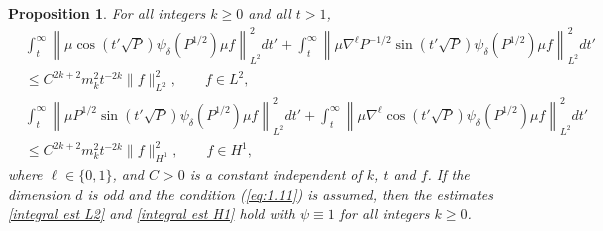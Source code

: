 \documentclass[11pt]{amsart}
\newtheorem{prop}[Theorem]{Proposition}
\numberwithin{equation}{section}
\begin{document}
\begin{prop} \label{integral estimates}
For all integers $k \ge 0$ and all $t>1$,
\begin{equation}\label{integral est L2}
\begin{split}
&\int_t^\infty \left\|\mu\cos(t'\sqrt{P})\psi_\delta(P^{1/2})\mu f\right\|_{L^2}^2dt'+
\int_t^\infty \left\|\mu\nabla^{\ell}P^{-1/2}\sin(t'\sqrt{P})\psi_\delta(P^{1/2})\mu f\right\|_{L^2}^2dt'\\
&\le  C^{2k+2}m_k^2t^{-2k}\|f\|_{L^2}^2,\qquad  f\in L^2,
\end{split}
\end{equation}
\begin{equation}\label{integral est H1}
\begin{split}
&\int_t^\infty \left\|\mu P^{1/2}\sin(t'\sqrt{P})\psi_\delta(P^{1/2})\mu f\right\|_{L^2}^2dt'+
\int_t^\infty \left\|\mu\nabla^{\ell}\cos(t'\sqrt{P})\psi_\delta(P^{1/2})\mu f\right\|_{L^2}^2dt'\\
&\le  C^{2k+2}m_k^2t^{-2k}\|f\|_{H^1}^2,\qquad  f\in H^1,
\end{split}
\end{equation}
where $\ell\in\{0,1\}$, and $C>0$ is a constant independent of $k$, $t$ and $f$. 
 If the dimension $d$ is odd and the condition (\ref{eq:1.11})
 is assumed, then the estimates \eqref{integral est L2} and \eqref{integral est H1} hold with $\psi\equiv 1$ for all integers $k\ge 0$. 
\end{prop}
\end{document}
